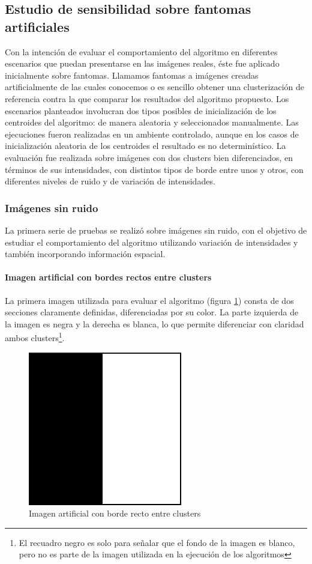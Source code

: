 \subsection{Estudio de sensibilidad sobre fantomas artificiales}
Con la intención de evaluar el comportamiento del algoritmo en diferentes escenarios que puedan presentarse en las imágenes reales, éste fue aplicado inicialmente sobre fantomas. Llamamos fantomas a imágenes creadas artificialmente de las cuales conocemos o es sencillo obtener una clusterización de referencia contra la que comparar los resultados del algoritmo propuesto. Los escenarios planteados involucran dos tipos posibles de inicialización de los centroides del algoritmo: de manera aleatoria y seleccionados manualmente. Las ejecuciones fueron realizadas en un ambiente controlado, aunque en los casos de inicialización aleatoria de los centroides el resultado es no determinístico. La evaluación fue realizada sobre imágenes con dos clusters bien diferenciados, en términos de sus intensidades, con distintos tipos de borde entre unos y otros, con diferentes niveles de ruido y de variación de intensidades.

\subsubsection{Imágenes sin ruido}
La primera serie de pruebas se realizó sobre imágenes sin ruido, con el objetivo de estudiar el comportamiento del algoritmo utilizando variación de intensidades y también incorporando información espacial.
\paragraph{Imagen artificial con bordes rectos entre clusters}
La primera imagen utilizada para evaluar el algoritmo (figura \ref{fig:mitad_mitad})  consta de dos secciones claramente definidas, diferenciadas por su color. La parte izquierda de la imagen es negra y la derecha es blanca, lo que permite diferenciar con claridad ambos clusters\footnote{El recuadro negro es solo para señalar que el fondo de la imagen es blanco, pero no es parte de la imagen utilizada en la ejecución de los algoritmos}.


\begin{figure}[H]
\centering
\includegraphics[scale=0.3]{images/mitad_mitad_250x250.png}
\caption{Imagen artificial con borde recto entre clusters}
\label{fig:mitad_mitad}
\end{figure}

